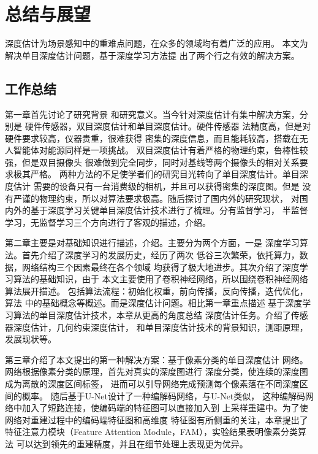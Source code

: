 \chapter{总结与展望}
深度估计为场景感知中的重难点问题，在众多的领域均有着广泛的应用。
本文为解决单目深度估计问题，基于深度学习方法提
出了两个行之有效的解决方案。

\section{工作总结}
第一章首先讨论了研究背景
和研究意义。当今针对深度估计有集中解决方案，分别是
硬件传感器，双目深度估计和单目深度估计。硬件传感器
法精度高，但是对硬件要求较高，仪器贵重，很难获得
密集的深度信息，而且能耗较高，搭载在无人智能体对能源同样是一项挑战。
双目深度估计有着严格的物理约束，鲁棒性较强，但是双目摄像头
很难做到完全同步，同时对基线等两个摄像头的相对关系要求极其严格。
两种方法的不足使学者们的研究目光转向了单目深度估计。单目深度估计
需要的设备只有一台消费级的相机，并且可以获得密集的深度图。但是
没有严谨的物理约束，所以对算法要求极高。随后探讨了国内外的研究现状，
对国内外的基于深度学习关键单目深度估计技术进行了梳理。分有监督学习，
半监督学习，无监督学习三个方向进行了客观的描述，介绍。

第二章主要是对基础知识进行描述，介绍。主要分为两个方面，一是
深度学习算法。首先介绍了深度学习的发展历史，经历了两次
低谷三次繁荣，依托算力，数据，网络结构三个因素最终在各个领域
均获得了极大地进步。其次介绍了深度学习算法的基础知识，由于
本文主要使用了卷积神经网络，所以围绕卷积神经网络算法展开描述。
包括算法流程：初始化权重，前向传播，反向传播，迭代优化，算法
中的基础概念等概述。而是深度估计问题。相比第一章重点描述
基于深度学习算法的单目深度估计技术，本章从更高的角度总结
深度估计任务。介绍了传感器深度估计，几何约束深度估计，
和单目深度估计技术的背景知识，测距原理，发展现状等。

第三章介绍了本文提出的第一种解决方案：基于像素分类的单目深度估计
网络。网络根据像素分类的原理，首先对真实的深度图进行
深度分类，使连续的深度图成为离散的深度区间标签，
进而可以引导网络完成预测每个像素落在不同深度区间的概率。
随后基于U-Net设计了一种编解码网络，与U-Net类似，
这种编解码网络中加入了短路连接，使编码端的特征图可以直接加入到
上采样重建中。为了使网络对重建过程中的编码端特征图和高维度
特征图有所侧重的关注，本章提出了特征注意力模块（Feature 
Attention Module，FAM），实验结果表明像素分类算法
可以达到领先的重建精度，并且在细节处理上表现更为优异。

